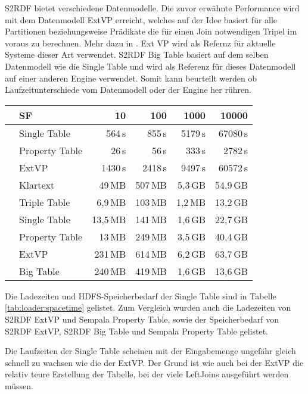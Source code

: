 \documentclass[
  a4paper,
  12pt,
  oneside,
  parskip=half,
  headsepline,
]{scrartcl}
\begin{document}
S2RDF bietet verschiedene Datenmodelle. Die zuvor erwähnte Performance wird mit
dem Datenmodell ExtVP erreicht, welches auf der Idee basiert für alle
Partitionen beziehungsweise Prädikate die für einen Join notwendigen Tripel im voraus zu
berechnen. Mehr dazu in \cite{s2rdf}. Ext VP wird als Refernz für aktuelle
Systeme dieser Art verwendet. S2RDF Big Table basiert auf dem selben Datenmodell
wie die Single Table und wird als Referenz für dieses Datenmodell auf einer
anderen Engine verwendet. Somit kann beurteilt werden ob Laufzeitunterschiede
vom Datenmodell oder der Engine her rühren.

\begin{table*}[htb]
	\centering
	\caption{Ladezeiten und HDFS-Speicherbedarf im Vergleich mit ähnlichen Systemen.}
	\label{tab:loader:spacetime}
	\begin{tabular*}{\textwidth}{ ll @{\extracolsep{\fill}} rrrr }
		\toprule
		& SF & 10 & 100 & 1000 & 10000 \\
		\midrule
		\multirow{3}{*}{\rotatebox{90}{\scriptsize{Ladezeit}}}
		& Single Table & 564\,s & 855\,s & 5179\,s & 67080\,s \\
		& Property Table & 26\,s & 56\,s & 333\,s & 2782\,s \\
		& ExtVP & 1430\,s & 2418\,s & 9497\,s & 60572\,s \\
		\midrule
		\multirow{6}{*}{\rotatebox{90}{\scriptsize{Speicherbedarf}}}
		& Klartext & 49\,MB & 507\,MB & 5,3\,GB & 54,9\,GB \\
		& Triple Table & 6,9\,MB & 103\,MB & 1,2\,MB & 13,2\,GB \\
		& Single Table & 13,5\,MB & 141\,MB & 1,6\,GB & 22,7\,GB \\
		& Property Table & 13\,MB & 249\,MB & 3,5\,GB & 40,4\,GB \\
		& ExtVP & 231\,MB & 614\,MB & 6,2\,GB & 63,7\,GB \\
		& Big Table & 240\,MB & 419\,MB & 1,6\,GB & 13,6\,GB \\
		\bottomrule
	\end{tabular*}
\end{table*}

Die Ladezeiten und HDFS-Speicherbedarf der Single Table sind in Tabelle
\ref{tab:loader:spacetime} gelistet. Zum Vergleich wurden auch die Ladezeiten
von S2RDF ExtVP und Sempala Property Table, sowie der Speicherbedarf von S2RDF
ExtVP, S2RDF Big Table und Sempala Property Table gelistet.

Die Laufzeiten der Single Table scheinen mit der Eingabemenge ungefähr gleich
schnell zu wachsen wie die der ExtVP. Der Grund ist wie auch bei der ExtVP die
relativ teure Erstellung der Tabelle, bei der viele LeftJoins ausgeführt werden
müssen.
\end{document}
